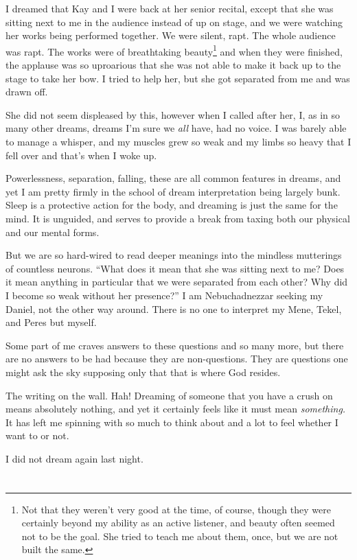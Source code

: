 I dreamed that Kay and I were back at her senior recital, except that she was sitting next to me in the audience instead of up on stage, and we were watching her works being performed together. We were silent, rapt. The whole audience was rapt. The works were of breathtaking beauty\footnote{Not that they weren't very good at the time, of course, though they were certainly beyond my ability as an active listener, and beauty often seemed not to be the goal. She tried to teach me about them, once, but we are not built the same.} and when they were finished, the applause was so uproarious that she was not able to make it back up to the stage to take her bow. I tried to help her, but she got separated from me and was drawn off.

She did not seem displeased by this, however when I called after her, I, as in so many other dreams, dreams I'm sure we \emph{all} have, had no voice. I was barely able to manage a whisper, and my muscles grew so weak and my limbs so heavy that I fell over and that's when I woke up.

Powerlessness, separation, falling, these are all common features in dreams, and yet I am pretty firmly in the school of dream interpretation being largely bunk. Sleep is a protective action for the body, and dreaming is just the same for the mind. It is unguided, and serves to provide a break from taxing both our physical and our mental forms.

But we are so hard-wired to read deeper meanings into the mindless mutterings of countless neurons. ``What does it mean that she was sitting next to me? Does it mean anything in particular that we were separated from each other? Why did I become so weak without her presence?'' I am Nebuchadnezzar seeking my Daniel, not the other way around. There is no one to interpret my Mene, Tekel, and Peres but myself.

Some part of me craves answers to these questions and so many more, but there are no answers to be had because they are non-questions. They are questions one might ask the sky supposing only that that is where God resides.

The writing on the wall. Hah! Dreaming of someone that you have a crush on means absolutely nothing, and yet it certainly feels like it must mean \emph{something.} It has left me spinning with so much to think about and a lot to feel whether I want to or not.

I did not dream again last night.

\section{}

